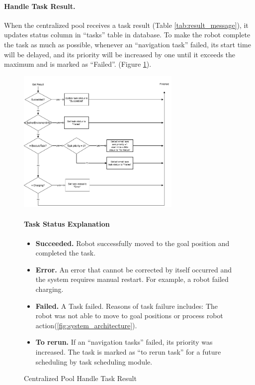 \paragraph{Handle Task Result.}
When the centralized pool receives a task result (Table \ref{tab:result_message}), it updates status column in ``tasks'' table in database. 
To make the robot complete the task as much as possible, whenever an ``navigation task'' failed, its start time will be delayed, and its priority will be increased by one until it exceeds the maximum and is marked as ``Failed''.
(Figure \ref{fig:centralized_task_handle}).


\begin{figure}
 \centering
 \includegraphics[width = 0.7\textwidth]{content/images/ch4/centralized_task_result.drawio.png}
 \caption{Centralized Pool Handle Task Result}
 \label{fig:centralized_task_handle}
 \paragraph{Task Status Explanation}
 \begin{itemize} 
 \item \textbf{Succeeded.} Robot successfully moved to the goal position and completed the task.
 \item \textbf{Error.} An error that cannot be corrected by itself occurred and the system requires manual restart. For example, a robot failed charging.
 \item \textbf{Failed.} A Task failed. Reasons of task failure includes: The robot was not able to move to goal positions or process robot action(\ref{fig:system_architecture}). 
 \item \textbf{To rerun.} If an ``navigation tasks'' failed, its priority was increased. The task is marked as ``to rerun task'' for a future scheduling by task scheduling module.
 \end{itemize} 
\end{figure}


